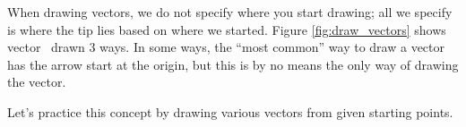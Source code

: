 
\enlargethispage{2\baselineskip}

\begin{myfigure}
\begin{center}
\end{center}
\label{fig:draw_vectors}
\end{myfigure}

When drawing vectors, we do not specify where you start drawing; all we specify is where the tip lies based on where we started. Figure \ref{fig:draw_vectors} shows vector \vx\ drawn 3 ways. In some ways, the ``most common'' way to draw a vector has the arrow start at the origin,%
 but this is by no means the only way of drawing the vector.

Let's practice this concept by drawing various vectors from given starting points.

\medskip

